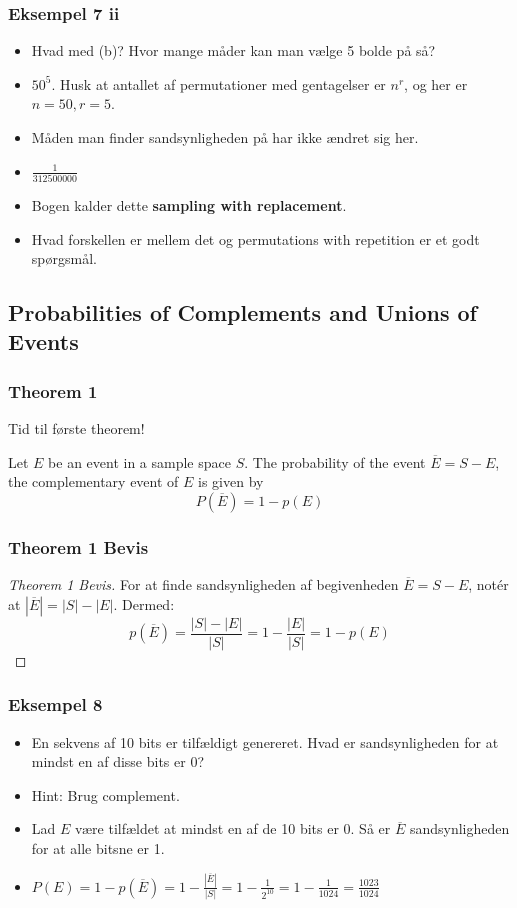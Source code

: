 \documentclass{beamer}
\begin{document}
\begin{frame}
  \frametitle{Eksempel 7 ii}
  \begin{itemize}
  \item<1-> Hvad med (b)? Hvor mange måder kan man vælge 5 bolde på så?
  \item<2-> $50^5$. Husk at antallet af permutationer med gentagelser er $n^r$, og her er $n = 50, r = 5$.
  \item<3-> Måden man finder sandsynligheden på har ikke ændret sig her.
  \item<3-> $\frac{1}{312500000}$
  \item<3-> Bogen kalder dette \textbf{sampling with replacement}.
  \item<3-> Hvad forskellen er mellem det og permutations with repetition er et godt spørgsmål.
  \end{itemize} 
\end{frame}

\subsection{Probabilities of Complements and Unions of Events}
\label{subsec:probcompunion}

\begin{frame}
  \frametitle{Theorem 1}
  Tid til første theorem!
  \begin{theorem}[Theorem 1]
    Let $E$ be an event in a sample space $S$. The probability of the event $\overline{E} = S - E$, the complementary event of $E$ is given by $$P(\overline{E}) = 1 - p(E)$$
  \end{theorem}
\end{frame}

\begin{frame}
  \frametitle{Theorem 1 Bevis}
  \begin{proof}[Theorem 1 Bevis]
    For at finde sandsynligheden af begivenheden $\overline{E} = S - E$, notér at $|\overline{E}| = |S| - |E|$. Dermed: $$p(\overline{E}) = \frac{|S|-|E|}{|S|}=1 - \frac{|E|}{|S|}=1-p(E)$$
  \end{proof}
\end{frame}

\begin{frame}
  \frametitle{Eksempel 8}
  \begin{itemize}
  \item<1-> En sekvens af 10 bits er tilfældigt genereret. Hvad er sandsynligheden for at mindst en af disse bits er 0?
  \item<1-> Hint: Brug complement.
  \item<2-> Lad $E$ være tilfældet at mindst en af de 10 bits er 0. Så er $\overline{E}$ sandsynligheden for at alle bitsne er 1. 
  \item<3-> $P(E) = 1-p(\overline{E})=1- \frac{|\overline{E}|}{|S|}=1- \frac{1}{2^{10}} = 1 - \frac{1}{1024} = \frac{1023}{1024}$
  \end{itemize}
\end{frame}
\end{document}
